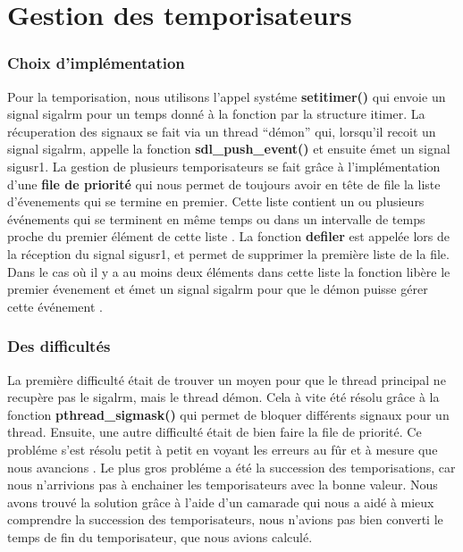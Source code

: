 \documentclass[a4paper]{article}
\begin{document}
\part{Gestion des temporisateurs}

\section{Choix d'implémentation}
Pour la temporisation, nous utilisons l'appel systéme \textbf{setitimer()} qui envoie un signal sigalrm pour un temps donné à la fonction par la structure itimer.
\newline La récuperation des signaux se fait via un thread ``démon'' qui, lorsqu'il recoit un signal sigalrm, appelle la fonction \textbf{sdl\_push\_event()} et ensuite émet un signal sigusr1.
\newline La gestion de plusieurs temporisateurs se fait grâce à l'implémentation d'une \textbf{file de priorité} qui nous permet de toujours avoir en tête de file la liste d'évenements qui se termine en premier. Cette liste contient un ou plusieurs événements qui se terminent en même temps ou dans un intervalle de temps proche du premier élément de cette liste .
\newline La fonction \textbf{defiler} est appelée lors de la réception du signal sigusr1, et permet de supprimer la première liste de la file. Dans le cas où il y a au moins deux éléments dans cette liste la fonction libère le premier évenement et émet un signal sigalrm pour que le démon puisse gérer cette événement . 

\section{Des difficultés}
La première difficulté était de trouver un moyen pour que le thread principal ne recupère pas le sigalrm, mais le thread démon. Cela à vite été résolu grâce à la fonction \textbf{pthread\_sigmask()} qui permet de bloquer différents signaux pour un thread.
\newline Ensuite, une autre difficulté était de bien faire la file de priorité. Ce probléme s'est résolu petit à petit en voyant les erreurs au fûr et à mesure que nous avancions .
\newline Le plus gros probléme a été la succession des temporisations, car nous n'arrivions pas à enchainer les temporisateurs avec la bonne valeur. Nous avons trouvé la solution grâce à l'aide d'un camarade qui nous a aidé à mieux comprendre la succession des temporisateurs, nous n'avions pas bien converti le temps de fin du temporisateur, que nous avions calculé.
\end{document}

